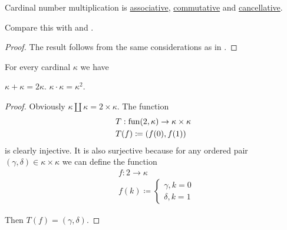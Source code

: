 \begin{proposition}\label{thm:cardinal_multiplication_algebraic_properties}
  Cardinal number multiplication is \hyperref[def:magma/associative]{associative}, \hyperref[def:magma/associative]{commutative} and \hyperref[def:magma/cancellative]{cancellative}.

  Compare this with  and .
\end{proposition}
\begin{proof}
  The result follows from the same considerations as in .
\end{proof}

\begin{proposition}\label{thm:double_and_square_of_cardinal}
  For every cardinal \( \kappa \) we have
  \begin{thmenum}
     \( \kappa + \kappa = 2\kappa \).
     \( \kappa \cdot \kappa = \kappa^2 \).
  \end{thmenum}
\end{proposition}
\begin{proof}
   Obviously \( \kappa \amalg \kappa = 2 \times \kappa \).
   The function
  \begin{equation*}
    \begin{aligned}
      &T: \operatorname{fun}(2, \kappa) \to \kappa \times \kappa \\
      &T(f) \coloneqq (f(0), f(1))
    \end{aligned}
  \end{equation*}
  is clearly injective. It is also surjective because for any ordered pair \( (\gamma, \delta) \in \kappa \times \kappa \) we can define the function
  \begin{equation*}
    \begin{aligned}
      &f: 2 \to \kappa \\
      &f(k) \coloneqq \begin{cases}
        \gamma, k = 0 \\
        \delta, k = 1
      \end{cases}
    \end{aligned}
  \end{equation*}

  Then \( T(f) = (\gamma, \delta) \).
\end{proof}

